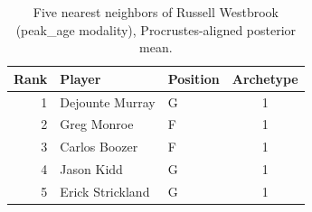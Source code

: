 \begin{table}[htbp]
  \centering\small
  \begin{tabular}{rllc}
    \toprule
    Rank & Player & Position & Archetype \\
    \midrule
    1 & Dejounte Murray & G & 1 \\
    2 & Greg Monroe & F & 1 \\
    3 & Carlos Boozer & F & 1 \\
    4 & Jason Kidd & G & 1 \\
    5 & Erick Strickland & G & 1 \\
    \bottomrule
  \end{tabular}
  \caption{Five nearest neighbors of Russell Westbrook (peak_age modality), Procrustes-aligned posterior mean.}
  \label{tab:Russell_Westbrook_neighbors_peak_age}
\end{table}


